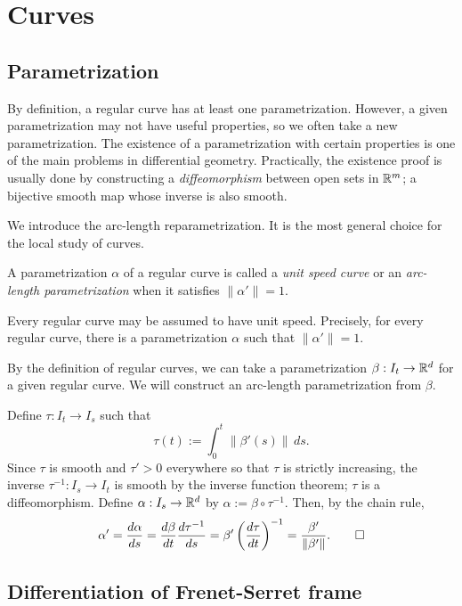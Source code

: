 \documentclass{../../large}
\def\a{\alpha}
\begin{document}
\section{Curves}

\subsection{Parametrization}

By definition, a regular curve has at least one parametrization.
However, a given parametrization may not have useful properties, so we often take a new parametrization.
The existence of a parametrization with certain properties is one of the main problems in differential geometry.
Practically, the existence proof is usually done by constructing a \emph{diffeomorphism} between open sets in $\mathbb{R}^m$; a bijective smooth map whose inverse is also smooth.

We introduce the arc-length reparametrization.
It is the most general choice for the local study of curves.
\begin{defn}
A parametrization $\a$ of a regular curve is called a \emph{unit speed curve} or an \emph{arc-length parametrization} when it satisfies $\|\a'\|=1$.
\end{defn}
\begin{thm}
Every regular curve may be assumed to have unit speed.
Precisely, for every regular curve, there is a parametrization $\a$ such that $\|\a'\|=1$.
\end{thm}
\begin{pf}
By the definition of regular curves, we can take a parametrization $\beta:I_t\to\mathbb{R}^d$ for a given regular curve.
We will construct an arc-length parametrization from $\beta$.

Define $\tau:I_t\to I_s$ such that
\[\tau(t):=\int_0^t\|\beta'(s)\|\,ds.\]
Since $\tau$ is smooth and $\tau'>0$ everywhere so that $\tau$ is strictly increasing, the inverse $\tau^{-1}:I_s\to I_t$ is smooth by the inverse function theorem; $\tau$ is a diffeomorphism.
Define $\a:I_s\to\R^d$ by $\a:=\beta\circ\tau^{-1}$.
Then, by the chain rule,
\[\a'=\dd{\a}{s}=\dd{\beta}{t}\dd{\tau^{-1}}{s}=\beta'\left(\dd{\tau}{t}\right)^{-1}=\frac{\beta'}{\|\beta'\|}.\qedhere\]
\end{pf}




\subsection{Differentiation of Frenet-Serret frame}
\end{document}
